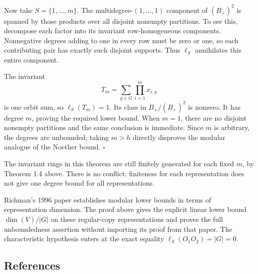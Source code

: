 \documentclass[
]{article}
\begin{document}
Now take \(S=\{1,\ldots,m\}\). The multidegree-\((1,\ldots,1)\)
component of \((B_+)^2\) is spanned by those products over all disjoint
nonempty partitions. To see this, decompose each factor into its
invariant row-homogeneous components. Nonnegative degrees adding to one
in every row must be zero or one, so each contributing pair has exactly
such disjoint supports. Thus \(\ell_S\) annihilates this entire
component.

The invariant \[
T_m=\sum_{g\in G}\prod_{i=1}^m x_{i,g}
\] is one orbit sum, so \(\ell_S(T_m)=1\). Its class in \(B_+/(B_+)^2\)
is nonzero. It has degree \(m\), proving the required lower bound. When
\(m=1\), there are no disjoint nonempty partitions and the same
conclusion is immediate. Since \(m\) is arbitrary, the degrees are
unbounded; taking \(m>h\) directly disproves the modular analogue of the
Noether bound. \(\square\)

The invariant rings in this theorem are still finitely generated for
each fixed \(m\), by Theorem 1.4 above. There is no conflict: finiteness
for each representation does not give one degree bound for all
representations.

Richman's 1996 paper establishes modular lower bounds in terms of
representation dimension. The proof above gives the explicit linear
lower bound \(\dim(V)/|G|\) on these regular-copy representations and
proves the full unboundedness assertion without importing its proof from
that paper. The characteristic hypothesis enters at the exact equality
\(\ell_S(O_1O_2)=|G|=0\).

\subsection{References}\label{references}
\end{document}
